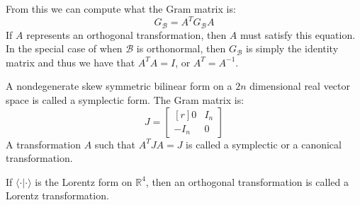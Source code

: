     From this we can compute what the Gram matrix is:
    \begin{equation}
        G_{\mathscr{B}}=A^{T}G_{\mathscr{B}}A
    \end{equation}
    If $A$ represents an orthogonal transformation, then $A$ must satisfy
    this equation. In the special case of when $\mathscr{B}$ is orthonormal,
    then $G_{\mathscr{B}}$ is simply the identity matrix and thus we have
    that $A^{T}A=I$, or $A^{T}=A^{\minus{1}}$.
    \par\hfill\par
    A nondegenerate skew symmetric bilinear form on a $2n$ dimensional real
    vector space is called a symplectic form. The Gram matrix is:
    \begin{equation}
        J=
        \begin{bmatrix*}[r]
            0&I_{n}\\
            \minus{I}_{n}&0
        \end{bmatrix*}
    \end{equation}
    A transformation $A$ such that $A^{T}JA=J$ is called a symplectic or
    a canonical transformation.
    \par\hfill\par
    If $\langle\cdot|\cdot\rangle$ is the Lorentz form on $\mathbb{R}^{4}$,
    then an orthogonal transformation is called a Lorentz transformation.
